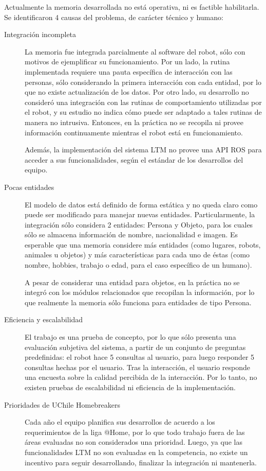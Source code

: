 Actualmente la memoria desarrollada no está operativa, ni es factible habilitarla. Se identificaron 4 causas del problema, de carácter técnico y humano:
\begin{description}
\item[Integración incompleta]
La memoria fue integrada parcialmente al software del robot, sólo con motivos de ejemplificar su funcionamiento. Por un lado, la rutina implementada requiere una pauta específica de interacción con las personas, sólo considerando la primera interacción con cada entidad, por lo que no existe actualización de los datos. Por otro lado, su desarrollo no consideró una integración con las rutinas de comportamiento utilizadas por el robot, y su estudio no indica cómo puede ser adaptado a tales rutinas de manera no intrusiva. Entonces, en la práctica no se recopila ni provee información continuamente mientras el robot está en funcionamiento.

Además, la implementación del sistema LTM no provee una API ROS para acceder a sus funcionalidades, según el estándar de los desarrollos del equipo. 

\item[Pocas entidades]
El modelo de datos está definido de forma estática y no queda claro como puede ser modificado para manejar nuevas entidades. Particularmente, la integración sólo considera 2 entidades: Persona y Objeto, para los cuales sólo se almacena información de nombre, nacionalidad e imagen. Es esperable que una memoria considere más entidades (como lugares, robots, animales u objetos) y más características para cada uno de éstas (como nombre, hobbies, trabajo o edad, para el caso específico de un humano). 

A pesar de considerar una entidad para objetos, en la práctica no se integró con los módulos relacionados que recopilan la información, por lo que realmente la memoria sólo funciona para entidades de tipo Persona.

\item[Eficiencia y escalabilidad]
El trabajo es una prueba de concepto, por lo que sólo presenta una evaluación subjetiva del sistema, a partir de un conjunto de preguntas predefinidas: el robot hace 5 consultas al usuario, para luego responder 5 consultas hechas por el usuario. Tras la interacción, el usuario responde una encuesta sobre la calidad percibida de la interacción. Por lo tanto, no existen pruebas de escalabilidad ni eficiencia de la implementación.

\item[Prioridades de UChile Homebreakers] Cada año el equipo planifica sus desarrollos de acuerdo a los requerimientos de la liga @Home, por lo que todo trabajo fuera de las áreas evaluadas no son considerados una prioridad. Luego, ya que las funcionalidades LTM no son evaluadas en la competencia, no existe un incentivo para seguir desarrollando, finalizar la integración ni mantenerla.
\end{description}

